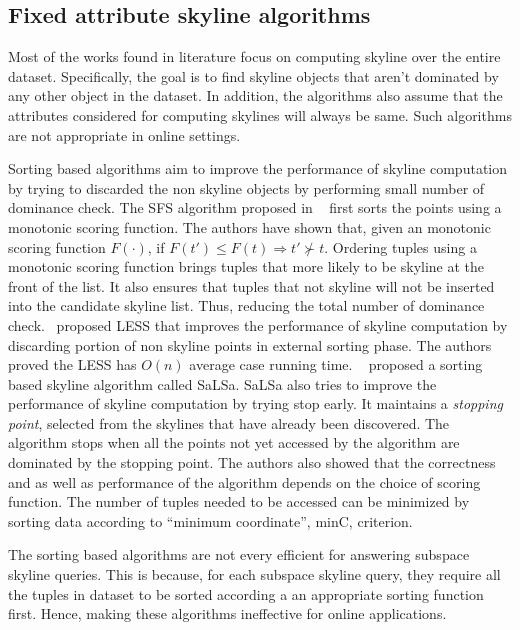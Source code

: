 \subsection{Fixed attribute skyline algorithms}
Most of the works found in literature focus on computing skyline over the entire dataset. Specifically, the goal is to find skyline objects that aren't dominated by any other object in the dataset. In addition, the algorithms also assume that the attributes considered for computing skylines will always be same. Such algorithms are not appropriate in online settings.

\vspace{1mm}
 Sorting based algorithms aim to improve the performance of skyline computation by trying to discarded the non skyline objects by performing small number of dominance check. The SFS algorithm proposed in ~\cite{chomicki2003skyline, chomicki2005skyline} first sorts the points using a monotonic scoring function. The authors have shown that, given an monotonic scoring function $F(\cdot)$, if $F(t') \leq F(t) \Rightarrow t' \nsucc t$. Ordering tuples using a monotonic scoring function brings tuples that more likely to be skyline at the front of the list. It also ensures that tuples that not skyline will not be inserted into the candidate skyline list. Thus, reducing the total number of dominance check.~\cite{godfrey2005maximal} proposed LESS that improves the performance of skyline computation by discarding portion of non skyline points in external sorting phase. The authors proved the LESS has $O(n)$ average case running time.  ~\cite{bartolini2008efficient} proposed a sorting based skyline algorithm called SaLSa. SaLSa also tries to improve the performance of skyline computation by trying stop early. It maintains a \textit{stopping point}, selected from the skylines that have already been discovered. The algorithm stops when all the points not yet accessed by the algorithm are dominated by the stopping point. The authors also showed that the correctness and as well as performance of the algorithm depends on the choice of scoring function. The number of tuples needed to be accessed can be minimized by sorting data according to ``minimum coordinate'', minC, criterion.

 The sorting based algorithms are not every efficient for answering subspace skyline queries. This is because, for each subspace skyline query, they require all the tuples in dataset to be sorted according a an appropriate sorting function first. Hence, making these algorithms ineffective for online applications.


